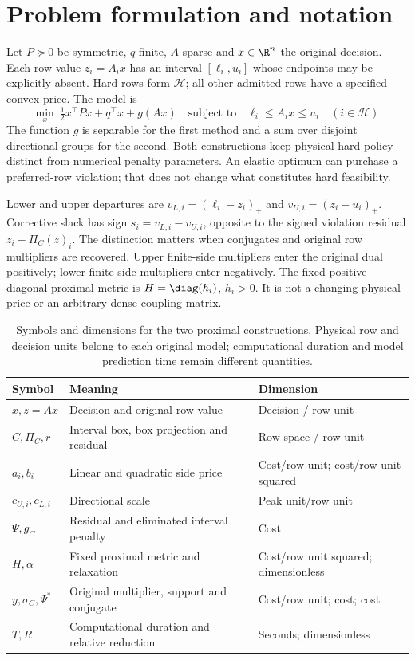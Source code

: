 \section{Problem formulation and notation}\label{sec:problem}
Let $P\succeq0$ be symmetric, $q$ finite, $A$ sparse and $x\in\R^n$ the
original decision. Each row value $z_i=A_i x$ has an interval
$[\ell_i,u_i]$ whose endpoints may be explicitly absent. Hard rows form
$\mathcal H$; all other admitted rows have a specified convex price. The
model is
\begin{equation}\label{eq:paper-model}
 \min_x\ \tfrac12x^\top P x+q^\top x+g(Ax)
 \quad\text{subject to}\quad
 \ell_i\leq A_ix\leq u_i\quad(i\in\mathcal H).
\end{equation}
The function $g$ is separable for the first method and a sum over disjoint
directional groups for the second. Both constructions keep physical hard
policy distinct from numerical penalty parameters. An elastic optimum can
purchase a preferred-row violation; that does not change what constitutes
hard feasibility.

Lower and upper departures are $v_{L,i}=(\ell_i-z_i)_+$ and
$v_{U,i}=(z_i-u_i)_+$. Corrective slack has sign
$s_i=v_{L,i}-v_{U,i}$, opposite to the signed violation residual
$z_i-\Pi_C(z)_i$. The distinction matters when conjugates and original
row multipliers are recovered. Upper finite-side multipliers enter the
original dual positively; lower finite-side multipliers enter negatively.
The fixed positive diagonal proximal metric is $H=\diag(h_i)$, $h_i>0$.
It is not a changing physical price or an arbitrary dense coupling matrix.

\begin{table}[htbp]\centering\small
\caption{Symbols and dimensions for the two proximal constructions. Physical row and decision units belong to each original model; computational duration and model prediction time remain different quantities.}\label{tab:paper-notation}
\begin{tabularx}{\textwidth}{@{}lXX@{}}\toprule
Symbol & Meaning & Dimension\\\midrule
$x,z=Ax$ & Decision and original row value & Decision / row unit\\
$C,\Pi_C,r$ & Interval box, box projection and residual & Row space / row unit\\
$a_i,b_i$ & Linear and quadratic side price & Cost/row unit; cost/row unit squared\\
$c_{U,i},c_{L,i}$ & Directional scale & Peak unit/row unit\\
$\Psi,g_C$ & Residual and eliminated interval penalty & Cost\\
$H,\alpha$ & Fixed proximal metric and relaxation & Cost/row unit squared; dimensionless\\
$y,\sigma_C,\Psi^*$ & Original multiplier, support and conjugate & Cost/row unit; cost; cost\\
$T,R$ & Computational duration and relative reduction & Seconds; dimensionless\\\bottomrule
\end{tabularx}
\end{table}

